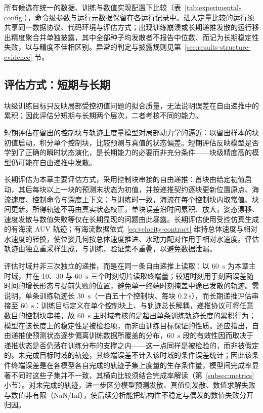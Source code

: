 所有候选在统一的数据、训练与数值实现配置下比较（表~\ref{tab:experimental-config}），命令级参数与运行元数据保留在各运行记录中。进入定量比较的运行须共享同一数据协议、代码环境与评估方式；出现训练崩溃或长期递推发散的运行移出精度聚合并单独披露，其中全部种子均发散者不报告中位数、而记为长期稳定性失败，以与精度不佳相区别。异常的判定与披露规则见第~\ref{sec:results-structure-evidence} 节。

\subsection{评估方式：短期与长期}
\label{subsec:rollout-eval}

块级训练目标只反映局部受控初值问题的拟合质量，无法说明误差在自由递推中的累积；因此评估分短期与长期两个层次，二者考核不同的能力。

短期评估在留出的控制块与轨迹上度量模型对局部动力学的逼近：以留出样本的块初值启动，积分单个控制块，比较预测与真值的状态偏差。短期评估反映模型是否学到了正确的瞬时状态演化，是长期能力的必要而非充分条件——块级精度高的模型仍可能在自由递推中发散。

长期评估为本章主要评估方式，采用控制块串接的自由递推：首块由给定初值启动，其后每块以上一块的预测末状态为初值，并按递推契约逐块更新位置原点、海流速度、控制命令与深度上下文；与训练时一致，海流在每个控制块内取常值、块间更新。所得轨迹不再由真实状态校正，单块误差沿时间累积、放大，姿态漂移、速度发散与数值失败等仅在长期显现的问题由此暴露。长期评估使用受控仿真生成的有海流 AUV 轨迹；有海流数据依式~\eqref{eq:velocity-contract} 维持总体速度与相对水速度的转换，使位姿几何按总体速度推进、水动力配对作用于相对水速度。评估轨迹由独立重采样生成，与训练、验证集不重叠，以避免数据泄漏。

评估时域并非三次独立的递推，而是在同一条自由递推上读取：以 60~\(\mathrm{s}\) 为本章主时域，并在 10、30 与 60~\(\mathrm{s}\) 三个时刻切片读取终端量；较短时刻用于刻画误差随时间的增长形态与提前失败的位置，避免单一终端时刻掩盖中途已发散的轨迹。需说明，单条训练轨迹长 30~\(\mathrm{s}\)（一百五十个控制块、每块 \(0.2~\mathrm{s}\)），而长期递推评估串接至 60~\(\mathrm{s}\)：训练目标定义在单个控制块上、与轨迹总长解耦，递推协议可将任意数目的控制块串接，故 60~\(\mathrm{s}\) 主时域考核的是超出单条训练轨迹长度的累积行为；模型在该长度上的稳定性是被检验项，而非由训练目标保证的性质。还应指出，自由递推使预测状态逐步偏离训练数据所覆盖的分布，60~\(\mathrm{s}\) 段的有效性因而取决于递推状态是否仍落在训练分布的支撑之内——这一点同样是被检验的，而非被假定的。未完成目标时域的轨迹，其终端误差不计入该时域的条件误差统计；因此该条件终端误差是在各模型各自完成的轨迹子集上度量的生存条件量，模型间完成率显著不同时这些子集并不一致，其横向比较须结合完成率解读（第~\ref{subsec:metrics} 小节）。对未完成的轨迹，进一步区分模型预测发散、真值侧发散、数值求解失败与数值非有限（NaN/Inf），使后续分析能把结构性不稳定与偶发的数值失败分开归因。

